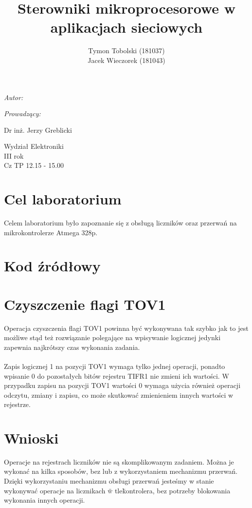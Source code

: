\documentclass[wide,a4paper,titlepage,12pt] {article}
\title{Sterowniki mikroprocesorowe w aplikacjach sieciowych}
\author{Tymon Tobolski (181037)\\ Jacek Wieczorek (181043)}
\makeatletter
\renewcommand{\maketitle}{
\begin{titlepage}
  \begin{center}
    \vspace*{3cm}
    \LARGE \@title \par
    \vspace{2cm}
    \textit{\small Autor:}\par
    \normalsize \@author\par \normalsize
    \vspace{3cm}
    \textit{\small Prowadzący:}\par
    Dr inż. Jerzy Greblicki \par
    \vspace{2cm}
    Wydział Elektroniki\\ III rok\\ Cz TP 12.15 - 15.00\par

  \end{center}
\end{titlepage}
}
\makeatother
\begin{document}
\maketitle
  \section{Cel laboratorium}
  \paragraph{}
  Celem laboratorium było zapoznanie się z obsługą liczników oraz przerwań na mikrokontrolerze Atmega 328p.

  \section{Kod źródłowy}
  

  \section{Czyszczenie flagi TOV1}
  \paragraph{}
  Operacja czyszczenia flagi TOV1 powinna być wykonywana tak szybko jak to
  jest możliwe stąd też rozwiązanie polegające na wpisywanie logicznej jedynki
  zapewnia najkrótszy czas wykonania zadania.
  \paragraph{} %

  Zapis logicznej 1 na pozycji TOV1 wymaga tylko jednej operacji,
  ponadto wpisanie 0 do pozostałych bitów rejestru TIFR1 nie zmieni ich wartości.
  W przypadku zapisu na pozycji TOV1 wartości 0 wymaga użycia również operacji odczytu, zmiany i zapisu,
  co może skutkować zmienieniem innych wartości w rejestrze.

  \section{Wnioski}
  \paragraph{}
  Operacje na rejestrach liczników nie są skomplikowanym zadaniem. Można je wykonać na kilka sposobów,
  bez lub z wykorzystaniem mechanizmu przerwań. Dzięki wykorzystaniu mechanizmu obsługi przerwań
  jesteśmy w stanie wykonywać operacje na licznikach \"w tle\" kontrolera, bez potrzeby blokowania
  wykonania innych operacji.
\end{document}
